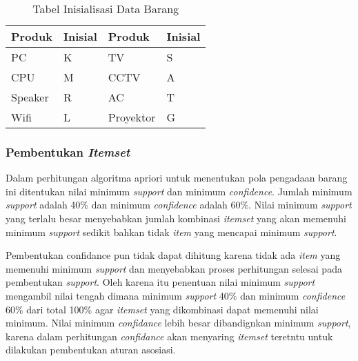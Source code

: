 \begin{table}[!h]
\caption{Tabel Inisialisasi Data Barang}
\begin{center}
\begin{tabular}{|l|l|l|l|}
\hline
Produk  & Inisial & Produk    & Inisial \\ \hline
PC      & K       & TV        & S       \\ \hline
CPU     & M       & CCTV      & A       \\ \hline
Speaker & R       & AC        & T       \\ \hline
Wifi    & L       & Proyektor & G       \\ \hline
\end{tabular}
\end{center}
\end{table}

\pagebreak
\subsubsection{Pembentukan \textit{Itemset}}
\par Dalam perhitungan algoritma apriori untuk menentukan pola pengadaan barang ini ditentukan  nilai minimum \textit{support} dan minimum \textit{confidence}. Jumlah minimum \textit{support} adalah 40\% dan minimum \textit{confidence} adalah 60\%.
Nilai minimum \textit{support} yang terlalu besar menyebabkan jumlah kombinasi \textit{itemset} yang akan memenuhi minimum \textit{support} sedikit bahkan tidak \textit{item} yang mencapai minimum \textit{support}.
\par
Pembentukan confidance pun tidak dapat dihitung karena tidak ada \textit{item} yang memenuhi minimum \textit{support} dan menyebabkan proses perhitungan selesai pada pembentukan \textit{support}. Oleh karena itu penentuan nilai minimum \textit{support} mengambil nilai tengah dimana minimum \textit{support}  40\% dan minimum \textit{confidence} 60\% dari total 100\% agar \textit{itemset} yang dikombinasi dapat memenuhi nilai minimum.
Nilai minimum \textit{confidance} lebih besar dibandignkan minimum \textit{support}, karena dalam perhitungan \textit{confidance} akan menyaring \textit{itemset} teretntu untuk dilakukan pembentukan aturan asosiasi.

